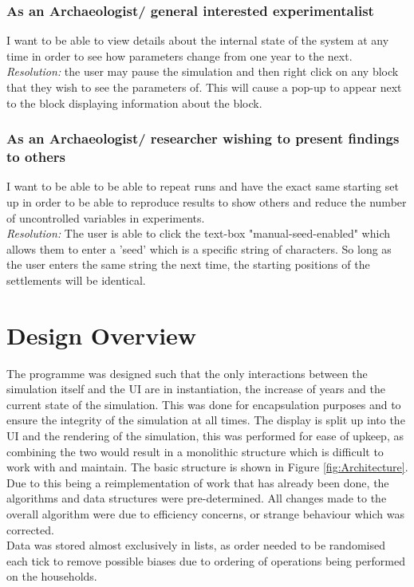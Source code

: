 \documentclass[12pt]{article}
\begin{document}
			\subsubsection{As an Archaeologist/ general interested experimentalist}
				I want to be able to view details about the internal state of the system at any time in order to see how parameters change from one year to the next.\\
				\textit{Resolution:} the user may pause the simulation and then right click on any block that they wish to see the parameters of. This will cause a pop-up to appear next to the block displaying information about the block.
			\subsubsection{As an Archaeologist/ researcher wishing to present findings to others} 
				I want to be able to be able to repeat runs and have the exact same starting set up in order to be able to reproduce results to show others and reduce the number of uncontrolled variables in experiments.\\
				\textit{Resolution:} The user is able to click the text-box "manual-seed-enabled" which allows them to enter a 'seed' which is a specific string of characters. So long as the user enters the same string the next time, the starting positions of the settlements will be identical. 
		
	\section{Design Overview}
		The programme was designed such that the only interactions between the simulation itself and the UI are in instantiation, the increase of years and the current state of the simulation. This was done for encapsulation purposes and to ensure the integrity of the simulation at all times. The display is split up into the UI and the rendering of the simulation, this was performed for ease of upkeep, as combining the two would result in a monolithic structure which is difficult to work with and maintain. The basic structure is shown in Figure \ref{fig:Architecture}.\\
		Due to this being a reimplementation of work that has already been done, the algorithms and data structures were pre-determined. All changes made to the overall algorithm were due to efficiency concerns, or strange behaviour which was corrected.\\
		Data was stored almost exclusively in lists, as order needed to be randomised each tick to remove possible biases due to ordering of operations being performed on the households.\\
		
\end{document}
